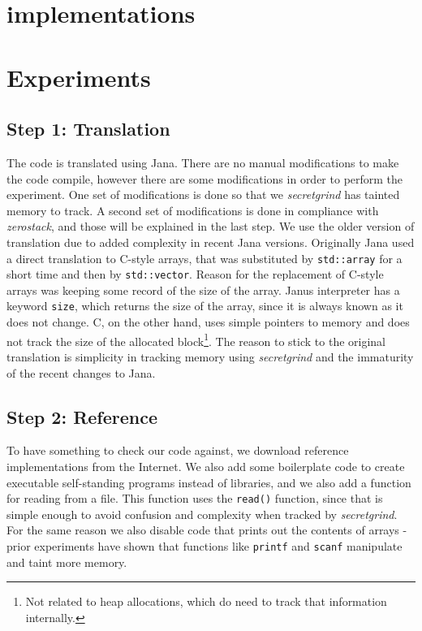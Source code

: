 \documentclass[a4paper,10pt,openright]{memoir}
\newcommand{\term}[1]{\textit{#1}}
\newcommand{\code}[1]{\texttt{#1}}
\begin{document}
\section{implementations}


\section{Experiments}

\subsection{Step 1: Translation}

The code is translated using Jana. There are no manual modifications to 
make the code compile, however there are some modifications in order to 
perform the experiment. One set of modifications is done so that we 
\term{secretgrind} has tainted memory to track. A second set of 
modifications is done in compliance with \term{zerostack}, and those 
will be explained in the last step. We use the older version of 
translation due to added complexity in recent Jana versions. Originally 
Jana used a direct translation to C-style arrays, that was substituted 
by \code{std::array} for a short time and then by \code{std::vector}. 
Reason for the replacement of C-style arrays was keeping some record of 
the size of the array. Janus interpreter has a keyword \code{size}, 
which returns the size of the array, since it is always known as it 
does not change. C, on the other hand, uses simple pointers to memory 
and does not track the size of the allocated block\footnote{Not related 
to heap allocations, which do need to track that information 
internally.}. The reason to stick to the original translation is 
simplicity in tracking memory using \term{secretgrind} and the 
immaturity of the recent changes to Jana.

\subsection{Step 2: Reference}

To have something to check our code against, we download reference 
implementations from the Internet. We also add some boilerplate code to 
create executable self-standing programs instead of libraries, and we 
also add a function for reading from a file. This function uses the 
\code{read()} function, since that is simple enough to avoid confusion 
and complexity when tracked by \term{secretgrind}. For the same reason 
we also disable code that prints out the contents of arrays - prior 
experiments have shown that functions like \code{printf} and \code{scanf} manipulate and 
taint more memory.
\end{document}
